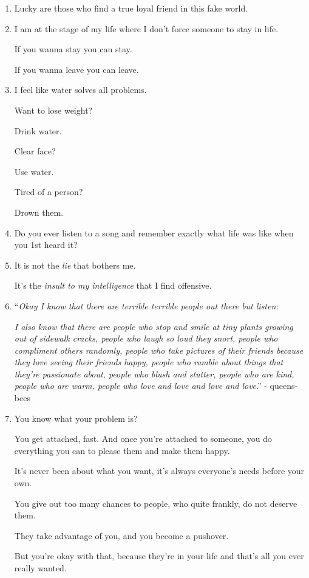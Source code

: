\documentclass{article}
\numberwithin{equation}{section}
\begin{document}
\begin{enumerate}
    This guy is Mark Zuckerberg.
    \item Lucky are those who find a true loyal friend in this fake world.
    \item I am at the stage of my life where I don't force someone to stay in life.
    
    If you wanna stay you can stay.
    
    If you wanna leave you can leave.
    \item I feel like water solves all problems.
    
    Want to lose weight?
    
    Drink water.
    
    Clear face?
    
    Use water.
    
    Tired of a person?
    
    Drown them.
    \item Do you ever listen to a song and remember exactly what life was like when you 1st heard it?
    \item It is not the \textit{lie} that bothers me.
    
    It's the \textit{insult to my intelligence} that I find offensive.
    \item ``\textit{Okay I know that there are terrible terrible people out there but listen:}
    
    \textit{I also know that there are people who stop and smile at tiny plants growing out of sidewalk cracks, people who laugh so loud they snort, people who compliment others randomly, people who take pictures of their friends because they love seeing their friends happy, people who ramble about things that they're passionate about, people who blush and stutter, people who are kind, people who are warm, people who love and love and love and love}.'' - queens-bees
    \item You know what your problem is?
    
    You get attached, fast.
    And once you're attached to someone, you do everything you can to please them and make them happy.
    
    It's never been about what you want, it's always everyone's needs before your own.
    
    You give out too many chances to people, who quite frankly, do not deserve them.
    
    They take advantage of you, and you become a pushover.
    
    But you're okay with that, because they're in your life and that's all you ever really wanted.
    

\end{enumerate}
\end{document}
